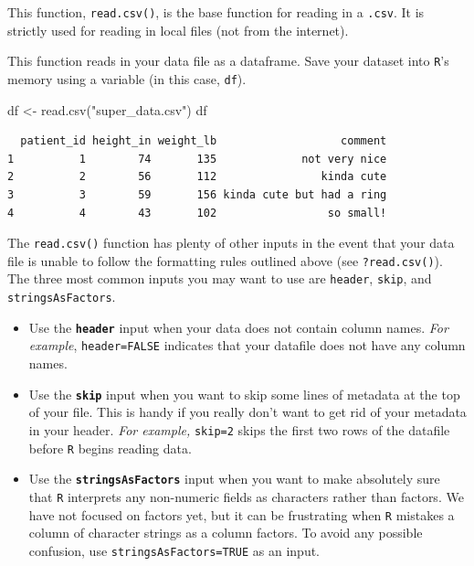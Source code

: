 \documentclass[
]{book}
\newenvironment{Shaded}{\begin{snugshade}}{\end{snugshade}}
\newcommand{\FunctionTok}[1]{\textcolor[rgb]{0.00,0.00,0.00}{#1}}
\newcommand{\NormalTok}[1]{#1}
\newcommand{\OtherTok}[1]{\textcolor[rgb]{0.56,0.35,0.01}{#1}}
\newcommand{\StringTok}[1]{\textcolor[rgb]{0.31,0.60,0.02}{#1}}
\begin{document}
This function, \texttt{read.csv()}, is the base function for reading in a \texttt{.csv}. It is strictly used for reading in local files (not from the internet).

This function reads in your data file as a dataframe. Save your dataset into \texttt{R}'s memory using a variable (in this case, \texttt{df}).

\begin{Shaded}
\begin{Highlighting}[]
\NormalTok{df }\OtherTok{\textless{}{-}} \FunctionTok{read.csv}\NormalTok{(}\StringTok{"super\_data.csv"}\NormalTok{)}
\NormalTok{df}
\end{Highlighting}
\end{Shaded}

\begin{verbatim}
  patient_id height_in weight_lb                   comment
1          1        74       135             not very nice
2          2        56       112                kinda cute
3          3        59       156 kinda cute but had a ring
4          4        43       102                 so small!
\end{verbatim}

The \texttt{read.csv()} function has plenty of other inputs in the event that your data file is unable to follow the formatting rules outlined above (see \texttt{?read.csv()}). The three most common inputs you may want to use are \texttt{header}, \texttt{skip}, and \texttt{stringsAsFactors}.

\begin{itemize}
\item
  Use the \textbf{\texttt{header}} input when your data does not contain column names. \emph{For example}, \texttt{header=FALSE} indicates that your datafile does not have any column names.
\item
  Use the \textbf{\texttt{skip}} input when you want to skip some lines of metadata at the top of your file. This is handy if you really don't want to get rid of your metadata in your header. \emph{For example,} \texttt{skip=2} skips the first two rows of the datafile before \texttt{R} begins reading data.
\item
  Use the \textbf{\texttt{stringsAsFactors}} input when you want to make absolutely sure that \texttt{R} interprets any non-numeric fields as characters rather than factors. We have not focused on factors yet, but it can be frustrating when \texttt{R} mistakes a column of character strings as a column factors. To avoid any possible confusion, use \texttt{stringsAsFactors=TRUE} as an input.
\end{itemize}
\end{document}
